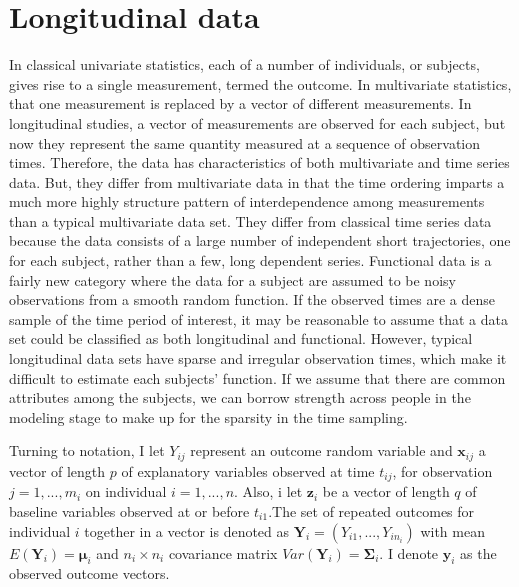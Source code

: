 \documentclass[12pt]{article}
\newcommand{\B}[0]{\mathbf}
\newcommand{\bs}[0]{\boldsymbol}
\begin{document}
\section{Longitudinal data}
In classical univariate statistics, each of a number of individuals, or subjects, gives rise to a single measurement, termed the outcome. In multivariate statistics, that one measurement is replaced by a vector of different measurements. In longitudinal studies, a vector of measurements are observed for each subject, but now they represent the same quantity measured at a sequence of observation times. Therefore, the data has characteristics of both multivariate and time series data. But, they differ from multivariate data in that the time ordering imparts a much more highly structure pattern of interdependence among measurements than a typical multivariate data set. They differ from classical time series data because the data consists of a large number of independent short trajectories, one for each subject, rather than a few, long dependent series. Functional data is a fairly new category \cite{ramsay2006} where the data for a subject are assumed to be noisy observations from a smooth random function. If the observed times are a dense sample of the time period of interest, it may be reasonable to assume that a data set could be classified as both longitudinal and functional. However, typical longitudinal data sets have sparse and irregular observation times, which make it difficult to estimate each subjects' function. If we assume that there are common attributes among the subjects, we can borrow strength across people in the modeling stage to make up for the sparsity in the time sampling. 

Turning to notation, I let $Y_{ij}$ represent an outcome random variable and $\B x_{ij}$ a vector of length $p$ of explanatory variables observed at time $t_{ij}$, for observation $j=1,...,m_{i}$ on individual $i=1,...,n$. Also, i let $\B z_{i}$ be a vector of length $q$ of baseline variables observed at or before $t_{i1}$.The set of repeated outcomes for individual $i$ together in a vector is denoted as $\B Y_{i} = (Y_{i1},...,Y_{in_{i}})$ with mean $E(\B Y_{i}) = \bs\mu_{i}$ and $n_{i}\times n_{i}$ covariance matrix $Var(\B Y_{i}) = \B\Sigma_{i}$. I denote $\B y_{i}$ as the observed outcome vectors. 
\end{document}
